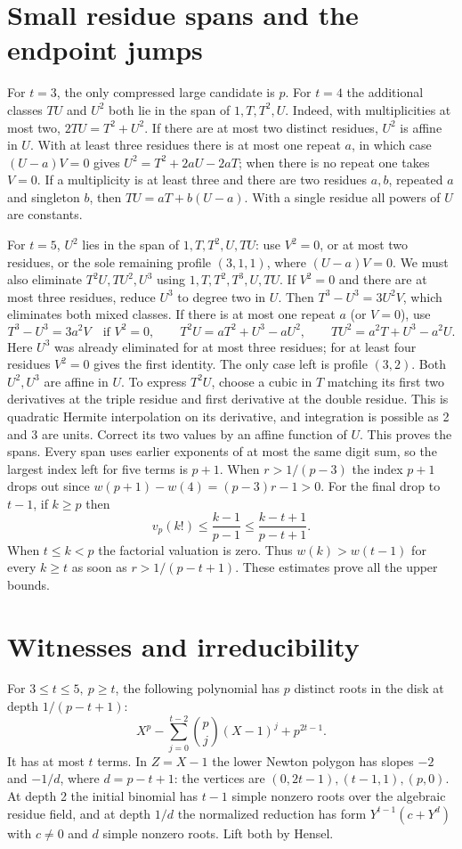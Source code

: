 \documentclass[11pt]{article}
\begin{document}
\section{Small residue spans and the endpoint jumps}
For \(t=3\), the only compressed large candidate is \(p\). For \(t=4\)
the additional classes \(TU\) and \(U^2\) both lie in the span of
\(1,T,T^2,U\). Indeed, with multiplicities at most two,
\(2TU=T^2+U^2\). If there are at most two distinct residues, \(U^2\)
is affine in \(U\). With at least three residues there is at most
one repeat \(a\), in which case \((U-a)V=0\) gives
\(U^2=T^2+2aU-2aT\); when there is no repeat one takes \(V=0\).
If a multiplicity is at least three and there are two residues
\(a,b\), repeated \(a\) and singleton \(b\), then
\(TU=aT+b(U-a)\). With a single residue all powers of \(U\) are constants.

For \(t=5\), \(U^2\) lies in the span of \(1,T,T^2,U,TU\):
use \(V^2=0\), or at most two residues, or the sole remaining
profile \((3,1,1)\), where \((U-a)V=0\).
We must also eliminate \(T^2U,TU^2,U^3\) using
\(1,T,T^2,T^3,U,TU\). If \(V^2=0\) and there are at most three
residues, reduce \(U^3\) to degree two in \(U\).
Then \(T^3-U^3=3U^2V\), which eliminates both mixed classes.
If there is at most one repeat \(a\) (or \(V=0\)), use
\[
 T^3-U^3=3a^2V\quad\text{if }V^2=0,\qquad
 T^2U=aT^2+U^3-aU^2,\qquad TU^2=a^2T+U^3-a^2U.
\]
Here \(U^3\) was already eliminated for at most three residues;
for at least four residues \(V^2=0\) gives the first identity.
The only case left is profile \((3,2)\). Both \(U^2,U^3\) are
affine in \(U\). To express \(T^2U\), choose a cubic in \(T\)
matching its first two derivatives at the triple residue and first
derivative at the double residue. This is quadratic Hermite
interpolation on its derivative, and integration is possible as
2 and 3 are units. Correct its two values by an affine function of \(U\).
This proves the spans. Every span uses earlier exponents of at most
the same digit sum, so the largest index left for five terms is \(p+1\).
\newpage
When \(r>1/(p-3)\) the index \(p+1\) drops out since
\(w(p+1)-w(4)=(p-3)r-1>0\).
For the final drop to \(t-1\), if \(k\ge p\) then
\[
 v_p(k!)\le \frac{k-1}{p-1}\le\frac{k-t+1}{p-t+1}.
\]
When \(t\le k<p\) the factorial valuation is zero. Thus
\(w(k)>w(t-1)\) for every \(k\ge t\) as soon as \(r>1/(p-t+1)\).
These estimates prove all the upper bounds.

\section{Witnesses and irreducibility}
For \(3\le t\le 5,\ p\ge t\), the following polynomial has \(p\)
distinct roots in the disk at depth \(1/(p-t+1)\):
\[
 X^p-\sum_{j=0}^{t-2}\binom pj(X-1)^j+p^{2t-1}.
\]
It has at most \(t\) terms. In \(Z=X-1\) the lower Newton polygon
has slopes \(-2\) and \(-1/d\), where \(d=p-t+1\):
the vertices are \((0,2t-1),(t-1,1),(p,0)\).
At depth 2 the initial binomial has \(t-1\) simple nonzero roots
over the algebraic residue field, and at depth \(1/d\) the
normalized reduction has form \(Y^{t-1}(c+Y^d)\) with \(c\ne0\)
and \(d\) simple nonzero roots. Lift both by Hensel.
\end{document}
